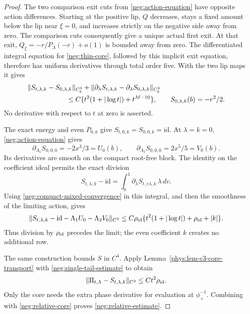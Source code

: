\begin{proof}
The two comparison exit cuts from \eqref{neg:action-equation}
have opposite action differences. Starting at the positive lip,
\(Q\) decreases, stays a fixed amount below the lip near
\(\xi=0\), and increases strictly on the negative side away from
zero. The comparison cuts consequently give a unique actual first
exit. At that exit,
\(Q_\xi=-r/P_\Lambda(-r)+o(1)\) is bounded away from zero.
The differentiated integral equation for \eqref{neg:thin-core},
followed by this implicit exit equation, therefore has uniform
derivatives through total order five. With the two lip maps it gives
\begin{equation}\label{neg:compact-mixed-convergence}
\begin{split}
 &\|S_{t,\lambda,k}-S_{0,\lambda,k}\|_{C_b^3}
  +\|\partial_\lambda S_{t,\lambda,k}
                -\partial_\lambda S_{0,\lambda,k}\|_{C_b^3}\\
 &\hspace{20mm}\le C\{t^2(1+|\log t|)+t^{M-10}\},
 \qquad S_{0,\lambda,k}(b)=-r^2/2 .
\end{split}
\end{equation}
No derivative with respect to \(t\) at zero is asserted.

The exact energy and even \(P_{0,k}\) give
\(S_{t,0,k}=S_{0,0,k}=\mathrm{id}\). At \(\lambda=k=0\),
\eqref{neg:action-equation} gives
\[
 \partial_{\Lambda_1}S_{0,0,0}=-2x^3/3=U_0(b),\qquad
 \partial_{\Lambda_2}S_{0,0,0}=2x^5/5=V_0(b).
\]
Its derivatives are smooth on the compact root-free block. The
identity on the coefficient ideal permits the exact division
\[
 S_{t,\lambda,k}-\mathrm{id}
      =\int_0^1\partial_\lambda S_{t,v\lambda,k}\,\lambda\,dv .
\]
Using \eqref{neg:compact-mixed-convergence} in this integral, and
then the smoothness of the limiting action, gives
\begin{equation}\label{neg:relative-core}
 \|S_{t,\lambda,k}-\mathrm{id}-\Lambda_1U_0-\Lambda_2V_0\|_{C^3}
  \le C\rho_{\rm id}
          \{t^2(1+|\log t|)+\rho_{\rm id}+|k|\} .
\end{equation}
Thus division by \(\rho_{\rm id}\) precedes the limit; the even
coefficient \(k\) creates no additional row.

The same construction bounds \(S\) in \(C^4\). Apply
Lemma~\ref{phys:lem-c3-core-transport} with
\eqref{neg:single-tail-estimate} to obtain
\begin{equation}\label{neg:composition-estimate}
 \|\Pi_{t,\Lambda}-S_{t,\lambda,k}\|_{C^3}
                       \le Ct^2\rho_{\rm id} .
\end{equation}
Only the core needs the extra phase derivative for evaluation at
\(\phi_+^{-1}\). Combining with \eqref{neg:relative-core} proves
\eqref{neg:relative-estimate}.
\end{proof}

